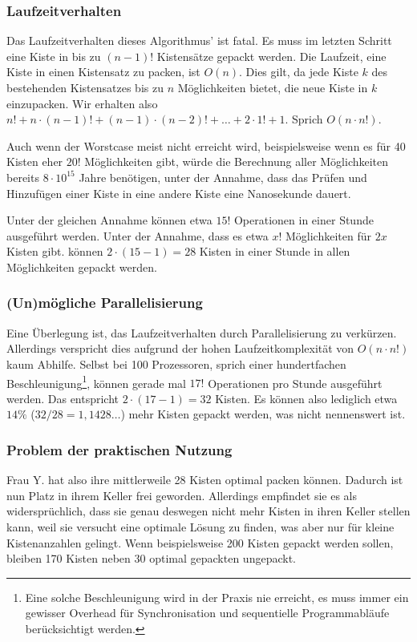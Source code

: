 \subsubsection{Laufzeitverhalten}
 Das Laufzeitverhalten dieses Algorithmus' ist fatal. Es muss im letzten Schritt eine Kiste in bis zu $(n-1)!$ Kistensätze gepackt werden.
 Die Laufzeit, eine Kiste in einen Kistensatz zu packen, ist $O(n)$.
 Dies gilt, da jede Kiste $k$ des bestehenden Kistensatzes bis zu $n$ Möglichkeiten bietet, die neue Kiste in $k$ einzupacken.
 Wir erhalten also $n! + n \cdot (n-1)! +  (n-1) \cdot (n-2)! + \dots + 2 \cdot 1! + 1$. Sprich $O(n \cdot n!)$.

 Auch wenn der Worstcase meist nicht erreicht wird, beispielsweise wenn es für 40 Kisten eher $20!$ Möglichkeiten gibt,
 würde die Berechnung aller Möglichkeiten bereits $8 \cdot 10^{15}$ Jahre benötigen,
  unter der Annahme, dass das Prüfen und Hinzufügen einer Kiste in eine andere Kiste eine Nanosekunde dauert.

 Unter der gleichen Annahme können etwa $15!$ Operationen in einer Stunde ausgeführt werden.
 Unter der Annahme, dass es etwa $x!$ Möglichkeiten für $2x$ Kisten gibt.
 können $2 \cdot (15-1)=28$ Kisten in einer Stunde in allen Möglichkeiten gepackt werden.
\subsubsection{(Un)mögliche Parallelisierung}
 Eine Überlegung ist, das Laufzeitverhalten durch Parallelisierung zu verkürzen.
 Allerdings verspricht dies aufgrund der hohen Laufzeitkomplexität von $O(n \cdot n!)$ kaum Abhilfe.
 Selbst bei 100 Prozessoren, sprich einer hundertfachen Beschleunigung\footnote{Eine solche Beschleunigung wird in der Praxis nie erreicht,
 es muss immer ein gewisser Overhead für Synchronisation und sequentielle Programmabläufe berücksichtigt werden.},
 können gerade mal $17!$ Operationen pro Stunde ausgeführt werden. Das entspricht $2 \cdot (17-1)=32$ Kisten.
 Es können also lediglich etwa $14\%$ ($32/28=1,1428\dots$) mehr Kisten gepackt werden, was nicht nennenswert ist.
\subsubsection{Problem der praktischen Nutzung}
 Frau Y. hat also ihre mittlerweile 28 Kisten optimal packen können. Dadurch ist nun Platz in ihrem Keller frei geworden.
 Allerdings empfindet sie es als widersprüchlich, dass sie genau deswegen nicht mehr Kisten in ihren Keller stellen kann, weil sie versucht eine optimale Lösung zu finden,
  was aber nur für kleine Kistenanzahlen gelingt.
 Wenn beispielsweise 200 Kisten gepackt werden sollen, bleiben 170 Kisten neben 30 optimal gepackten ungepackt.
